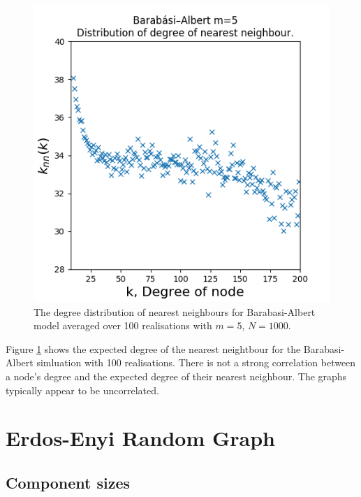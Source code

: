 \documentclass{article}
\begin{document}
\begin{figure}[H]
\includegraphics[scale=0.8]{degree_neighbour_a.png} 
\caption{The degree distribution of nearest neighbours for Barabasi-Albert model averaged over 100 realisations with $m=5$, $N = 1000$.} 
\label{fig:neighbour}
\end{figure}

Figure \ref{fig:neighbour} shows the expected degree of the nearest neightbour for the Barabasi-Albert simluation with 100 realisations. There is not a strong correlation between a node's degree and the expected degree of their nearest neighbour. The graphs typically appear to be uncorrelated.


\section{Erdos-Enyi Random Graph}

\subsection{Component sizes}
\end{document}
